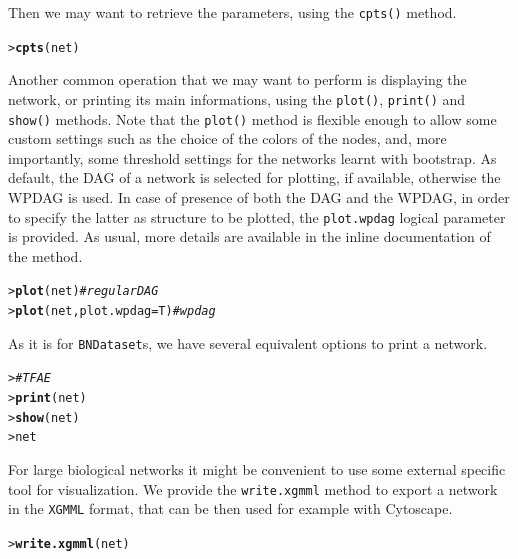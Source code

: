 \documentclass{article}\usepackage[]{graphicx}\usepackage[]{color}
\makeatletter
\newcommand{\hlcom}[1]{\textcolor[rgb]{0.678,0.584,0.686}{\textit{#1}}}%
\newcommand{\hlstd}[1]{\textcolor[rgb]{0.345,0.345,0.345}{#1}}%
\newcommand{\hlkwc}[1]{\textcolor[rgb]{0.333,0.667,0.333}{#1}}%
\newcommand{\hlkwd}[1]{\textcolor[rgb]{0.737,0.353,0.396}{\textbf{#1}}}%
\newenvironment{kframe}{%
 \def\at@end@of@kframe{}%
 \ifinner\ifhmode%
  \def\at@end@of@kframe{\end{minipage}}%
  \begin{minipage}{\columnwidth}%
 \fi\fi%
 \def\FrameCommand##1{\hskip\@totalleftmargin \hskip-\fboxsep
 \colorbox{shadecolor}{##1}\hskip-\fboxsep
     \hskip-\linewidth \hskip-\@totalleftmargin \hskip\columnwidth}%
 \MakeFramed {\advance\hsize-\width
   \@totalleftmargin\z@ \linewidth\hsize
   \@setminipage}}%
 {\par\unskip\endMakeFramed%
 \at@end@of@kframe}
\newenvironment{knitrout}{}{} %
\newcommand{\Robject}[1]{{\texttt{#1}}}
\newcommand{\Rmethod}[1]{{\texttt{#1}}}
\newcommand{\Rfunarg}[1]{{\texttt{#1}}}
\makeatother
\begin{document}
Then we may want to retrieve the parameters, using the \Rmethod{cpts()} method.
\begin{knitrout}
\color{fgcolor}\begin{kframe}
\begin{alltt}
\hlstd{> }\hlkwd{cpts}\hlstd{(net)}
\end{alltt}
\end{kframe}
\end{knitrout}

Another common operation that we may want to perform is displaying the network, or printing its main informations, using the
\Rmethod{plot()}, \Rmethod{print()} and \Rmethod{show()} methods. Note that the \Rmethod{plot()} method is flexible enough to allow 
some custom settings such as the choice of the colors of the nodes, and, more importantly, some threshold settings 
for the networks learnt with bootstrap. As default, the DAG of a network is selected for plotting, if available,
otherwise the WPDAG is used. In case of presence of both the DAG and the WPDAG, in order to specify the latter as
structure to be plotted, the \Rfunarg{plot.wpdag} logical parameter is provided. As usual, more details are available
in the inline documentation of the method.
\begin{knitrout}
\color{fgcolor}\begin{kframe}
\begin{alltt}
\hlstd{> }\hlkwd{plot}\hlstd{(net)} \hlcom{# regular DAG}
\hlstd{> }\hlkwd{plot}\hlstd{(net,} \hlkwc{plot.wpdag}\hlstd{=T)} \hlcom{# wpdag}
\end{alltt}
\end{kframe}
\end{knitrout}

As it is for \Robject{BNDataset}s, we have several equivalent options to print a network.
\begin{knitrout}
\color{fgcolor}\begin{kframe}
\begin{alltt}
\hlstd{> }\hlcom{# TFAE}
\hlstd{> }\hlkwd{print}\hlstd{(net)}
\hlstd{> }\hlkwd{show}\hlstd{(net)}
\hlstd{> }\hlstd{net}
\end{alltt}
\end{kframe}
\end{knitrout}

For large biological networks it might be convenient to use some external specific tool for visualization.
We provide the \Rfunarg{write.xgmml} method to export a network in the \texttt{XGMML} format, that can be
then used for example with Cytoscape.
\begin{knitrout}
\color{fgcolor}\begin{kframe}
\begin{alltt}
\hlstd{> }\hlkwd{write.xgmml}\hlstd{(net)}
\end{alltt}
\end{kframe}
\end{knitrout}
\end{document}
